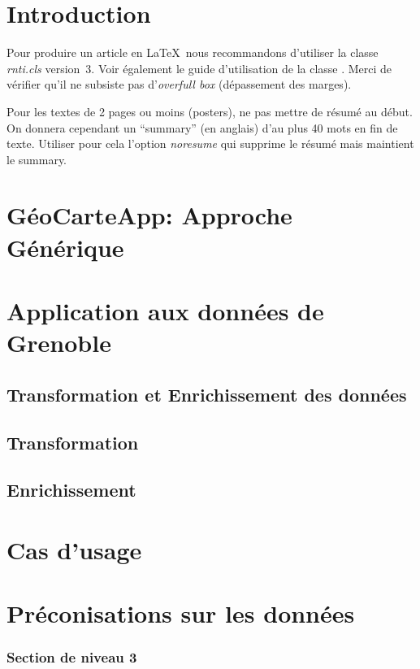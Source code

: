 \documentclass[a4paper,pagenum,french,showlayout]{rnti}
\affiliation{
    \affil{1}Univ Lyon, MINES Saint-\'Etienne, CNRS, Laboratoire Hubert Curien UMR 5516, \\F-42023 Saint-\'Etienne, France\\
          \{prenom.nom\}@emse.fr\\
    \affil{2}Mondeca, \\ 35 boulevard Strasbourg, Paris, France\\
          ghislain.atemezing@mondeca.com\\
          \http{http://www.mondeca.com}
 }
\begin{document}
%
\section{Introduction}

Pour produire un article en \LaTeX\ nous recommandons d'utiliser la
classe \textit{rnti.cls} version~3. Voir également le guide
d'utilisation de la classe \citep{ritschard:2005rnti}. Merci de
vérifier qu'il ne subsiste pas d'\emph{overfull box} (dépassement
des marges).

Pour les textes de 2 pages ou moins (posters), ne pas mettre de
résumé au début. On donnera cependant un ``summary'' (en anglais)
d'au plus 40 mots en fin de texte. Utiliser pour cela l'option
\textit{noresume} qui supprime le résumé mais maintient le summary.

\section{GéoCarteApp: Approche Générique}

\section{Application aux données de Grenoble}

\subsection{Transformation et Enrichissement des données}

\subsection{Transformation}

\subsection{Enrichissement}


\section{Cas d'usage}

\section{Préconisations sur les données}


\subsubsection{Section de niveau 3}
\end{document}
